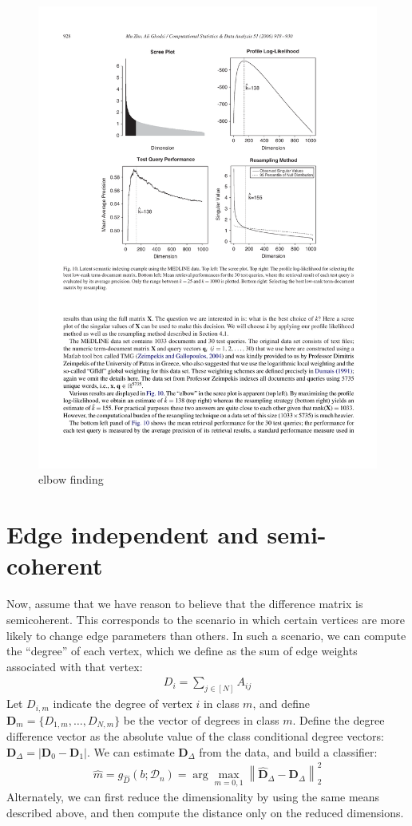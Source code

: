 \documentclass{article}
\newcommand{\mD}{\mathcal{D}}
\newcommand{\hm}{\widehat{m}}
\newcommand{\hD}{\widehat{D}}
\newcommand{\bD}{\mathbf{D}}
\providecommand{\norm}[1]{\left \lVert#1 \right  \rVert}
\newcommand{\hbD}{\widehat{\mathbf{D}}}
\begin{document}
\begin{figure}[h!]
\centering \includegraphics[width=.9\linewidth]{AutoElbow}
\caption{elbow finding}
\label{fig:elbow}
\end{figure}



\section{Edge independent and semi-coherent} %
\label{sub:edge_independent_and_semi_coherent}

Now, assume that we have reason to believe that the difference matrix is semicoherent.  This corresponds to the scenario in which certain vertices are more likely to change edge parameters than others.  In such a scenario, we can compute the ``degree'' of each vertex, which we define as the sum of edge weights associated with that vertex:
\begin{align}
	D_i = \sum_{j \in [N]} A_{ij}
\end{align}
Let $D_{i,m}$ indicate the degree of vertex $i$ in class $m$, and define $\bD_m=\{D_{1,m},\ldots,D_{N,m}\}$ be the vector of degrees in class $m$.  Define the degree difference vector as the absolute value of the class conditional degree vectors: $\bD_{\Delta}=|\bD_0-\bD_1|$.  We can estimate $\bD_{\Delta}$ from the data, and build a classifier:
\begin{align}
	\hm=g_{\hD}(b;\mD_n)=\arg \max_{m=0,1} \norm{\hbD_{\Delta}-\bD_{\Delta}}_2^2
\end{align}
Alternately, we can first reduce the dimensionality by using the same means described above, and then compute the distance only on the reduced dimensions.
\end{document}
